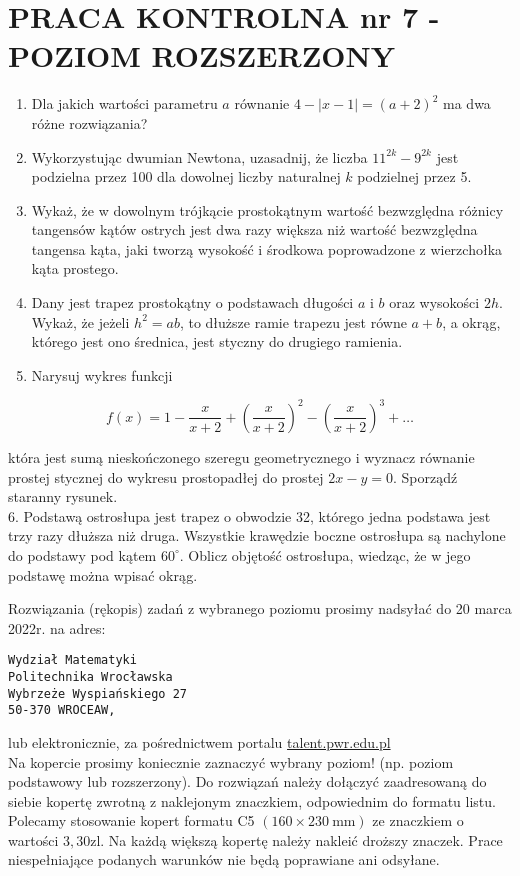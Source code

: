\documentclass[10pt]{article}
\begin{document}
\section*{PRACA KONTROLNA nr 7 - POZIOM ROZSZERZONY}
\begin{enumerate}
  \item Dla jakich wartości parametru $a$ równanie $4-|x-1|=(a+2)^{2}$ ma dwa różne rozwiązania?
  \item Wykorzystując dwumian Newtona, uzasadnij, że liczba $11^{2 k}-9^{2 k}$ jest podzielna przez 100 dla dowolnej liczby naturalnej $k$ podzielnej przez 5.
  \item Wykaż, że w dowolnym trójkącie prostokątnym wartość bezwzględna różnicy tangensów kątów ostrych jest dwa razy większa niż wartość bezwzględna tangensa kąta, jaki tworzą wysokość i środkowa poprowadzone z wierzchołka kąta prostego.
  \item Dany jest trapez prostokątny o podstawach długości $a$ i $b$ oraz wysokości $2 h$. Wykaż, że jeżeli $h^{2}=a b$, to dłuższe ramie trapezu jest równe $a+b$, a okrąg, którego jest ono średnica, jest styczny do drugiego ramienia.
  \item Narysuj wykres funkcji
\end{enumerate}

$$
f(x)=1-\frac{x}{x+2}+\left(\frac{x}{x+2}\right)^{2}-\left(\frac{x}{x+2}\right)^{3}+\ldots
$$

która jest sumą nieskończonego szeregu geometrycznego i wyznacz równanie prostej stycznej do wykresu prostopadłej do prostej $2 x-y=0$. Sporządź staranny rysunek.\\
6. Podstawą ostrosłupa jest trapez o obwodzie 32, którego jedna podstawa jest trzy razy dłuższa niż druga. Wszystkie krawędzie boczne ostrosłupa są nachylone do podstawy pod kątem $60^{\circ}$. Oblicz objętość ostrosłupa, wiedząc, że w jego podstawę można wpisać okrąg.

Rozwiązania (rękopis) zadań z wybranego poziomu prosimy nadsyłać do 20 marca 2022r. na adres:

\begin{verbatim}
Wydział Matematyki
Politechnika Wrocławska
Wybrzeże Wyspiańskiego 27
50-370 WROCEAW,
\end{verbatim}

lub elektronicznie, za pośrednictwem portalu \href{http://talent.pwr.edu.pl}{talent.pwr.edu.pl}\\
Na kopercie prosimy koniecznie zaznaczyć wybrany poziom! (np. poziom podstawowy lub rozszerzony). Do rozwiązań należy dołączyć zaadresowaną do siebie kopertę zwrotną z naklejonym znaczkiem, odpowiednim do formatu listu. Polecamy stosowanie kopert formatu C5 $(160 \times 230 \mathrm{~mm})$ ze znaczkiem o wartości $3,30 \mathrm{zl}$. Na każdą większą kopertę należy nakleić droższy znaczek. Prace niespełniające podanych warunków nie będą poprawiane ani odsyłane.
\end{document}
